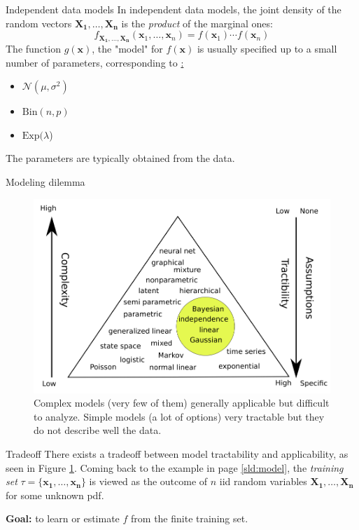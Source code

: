 \documentclass{beamer}
\begin{document}
\begin{frame}{Independent data models}
  In independent data models, the joint density of the random vectors $\bm{X_1},\ldots,\bm{X_n}$ is the {\em product} of the marginal ones:
  \[
    f_{\bm{X_1},\ldots,\bm{X_n}}(\bm{x}_1,\ldots,\bm{x}_n)=f(\bm{x}_1)\cdots f(\bm{x}_n)  
  \]
  The function $g(\bm{x})$, the "model" for $f(\bm{x})$ is usually specified up to a small number of parameters, corresponding to \href{common probability distributions}:
  \begin{itemize}
    \item $\mathcal{N}(\mu,\sigma^2)$
    \item $\mathrm{Bin}(n,p)$
    \item $\mathrm{Exp}(\lambda$)
  \end{itemize}
  The parameters are typically obtained from the data.
\end{frame}

\begin{frame}{Modeling dilemma}
  \begin{figure}
    \includegraphics[width=0.7\linewidth]{dilemma}
    \caption{Complex models (very few of them) generally applicable but difficult to analyze. Simple models (a lot of options) very tractable but they do not describe well the data\cite{kroese2020}.}
    \label{fig:dilemma}
  \end{figure}
\end{frame}

\begin{frame}{Tradeoff}
  There exists a tradeoff between model tractability and applicability, as seen in Figure \ref{fig:dilemma}. Coming back to the example in page \ref{sld:model}, the {\em training set} $\tau = \{\bm{x_1},\ldots,\bm{x_n}\}$ is viewed as the outcome of $n$ iid random variables $\bm{X_1},\ldots,\bm{X_n}$ for some unknown pdf.

  {\bf Goal:} to learn or estimate $f$ from the finite training set.
\end{frame}
\end{document}
